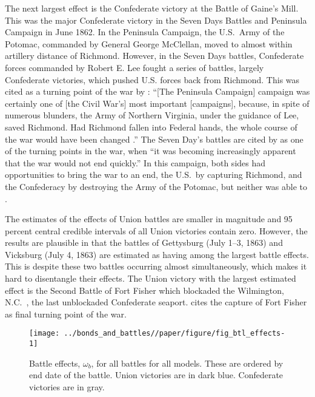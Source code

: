 The next largest effect is the Confederate victory at the Battle of Gaine's Mill.
This was the major Confederate victory in the Seven Days Battles and Peninsula Campaign in June 1862.
In the Peninsula Campaign, the U.S.\ Army of the Potomac, commanded by General George McClellan, moved to almost within artillery distance of Richmond.
However, in the Seven Days battles, Confederate forces commanded by Robert E. Lee fought a series of battles, largely Confederate victories, which pushed U.S. forces back from Richmond.
This was cited as a turning point of the war by \textcite{Fuller1942a}: ``[The Peninsula Campaign] campaign was certainly one of [the Civil War's] most important [campaigns], because, in spite of numerous blunders, the Army of Northern Virginia, under the guidance of Lee, saved Richmond. Had Richmond fallen into Federal hands, the whole course of the war would have been changed \parencite[206]{Fuller1942a}.''
The Seven Day's battles are cited by \textcite[145]{Reiter2009} as one of the turning points in the war, when ``it was becoming increasingly apparent that the war would not end quickly.''
In this campaign, both sides had opportunities to bring the war to an end, the U.S.\ by capturing Richmond, and the Confederacy by destroying the Army of the Potomac, but neither was able to \parencite[Chapter6]{Fuller1942a}. 

The estimates of the effects of Union battles are smaller in magnitude and  95 percent central credible intervals of all Union victories contain zero.
However, the results are plausible in that the battles of Gettysburg (July 1--3, 1863) and Vicksburg (July 4, 1863) are estimated as having among the largest battle effects.
This is despite these two battles occurring almost simultaneously, which makes it hard to disentangle their effects.
The Union victory with the largest estimated effect is the Second Battle of Fort Fisher which blockaded the Wilmington, N.C.\ , the last unblockaded Confederate seaport. 
\textcite[154]{Reiter2009} cites the capture of Fort Fisher as final turning point of the war.

\begin{figure}[!htpb]
  \centering
  \texttt{[image: ../bonds\_and\_battles//paper/figure/fig\_btl\_effects-1]}
  \caption[Battle effects, $\omega_{b}$, for all battles for all models]{Battle effects, $\omega_{b}$, for all battles for all models.
    These are ordered by end date of the battle.
    Union victories are in dark blue.
    Confederate victories are in gray.
  }
  \label{bonds:fig:btl_effects}
\end{figure}

